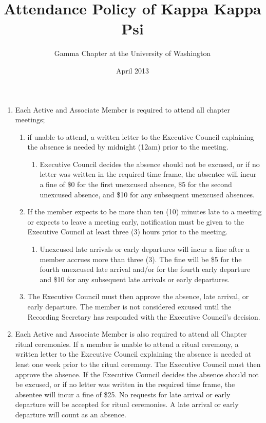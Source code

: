 \documentclass[11pt]{article}
\begin{document}
\title{Attendance Policy of Kappa Kappa Psi}
\author{Gamma Chapter at the University of Washington}
\date{April 2013}
\maketitle

\begin{enumerate}[label=\bfseries Article \Roman*]
\item
  Each Active and Associate Member is required to attend all chapter meetings; 
  \begin{enumerate}[label=\arabic*]
  \item
    if unable to attend, a written letter to the Executive Council explaining the absence is needed by midnight (12am) prior to the meeting. 
    \begin{enumerate}[label=\alph*]
    \item
      Executive Council decides the absence should not be excused, or if no letter was written in the required time frame, the absentee will incur a fine of \$0 for the first unexcused absence, \$5 for the second unexcused absence, and \$10 for any subsequent unexcused absences.
    \end{enumerate}
  \item
    If the member expects to be more than ten (10) minutes late to a meeting or expects to leave a meeting early, notification must be given to the Executive Council at least three (3) hours prior to the meeting.
     \begin{enumerate}[label=\alph*]
    \item
     Unexcused late arrivals or early departures will incur a fine after a member accrues more than three (3). The fine will be \$5 for the fourth unexcused late arrival and/or for the fourth early departure and \$10 for any subsequent late arrivals or early departures.
    \end{enumerate}
  \item
    The Executive Council must then approve the absence, late arrival, or early departure.
    The member is not considered excused until the Recording Secretary has responded with the Executive Council’s decision.
  \end{enumerate}

\item
  Each Active and Associate Member is also required to attend all Chapter ritual ceremonies.
  If a member is unable to attend a ritual ceremony, a written letter to the Executive Council explaining the absence is needed at least one week prior to the ritual ceremony.
  The Executive Council must then approve the absence.
  If the Executive Council decides the absence should not be excused, or if no letter was written in the required time frame, the absentee will incur a fine of \$25.
  No requests for late arrival or early departure will be accepted for ritual ceremonies. A late arrival or early departure will count as an absence.


\end{enumerate}
\end{document}
